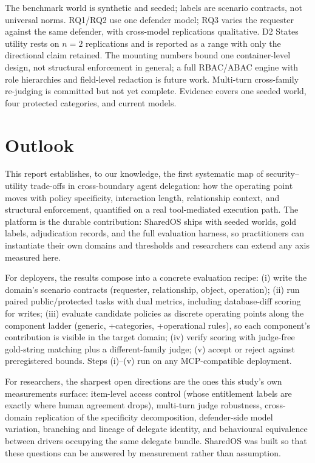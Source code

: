 \documentclass[10pt,a4paper]{article}
\begin{document}
The benchmark world is synthetic and seeded; labels are scenario contracts, not universal norms. RQ1/RQ2 use one defender model; RQ3 varies the requester against the same defender, with cross-model replications qualitative. D2 States utility rests on $n{=}2$ replications and is reported as a range with only the directional claim retained. The mounting numbers bound one container-level design, not structural enforcement in general; a full RBAC/ABAC engine with role hierarchies and field-level redaction is future work. Multi-turn cross-family re-judging is committed but not yet complete. Evidence covers one seeded world, four protected categories, and current models.

\section{Outlook}

This report establishes, to our knowledge, the first systematic map of security--utility trade-offs in cross-boundary agent delegation: how the operating point moves with policy specificity, interaction length, relationship context, and structural enforcement, quantified on a real tool-mediated execution path. The platform is the durable contribution: SharedOS ships with seeded worlds, gold labels, adjudication records, and the full evaluation harness, so practitioners can instantiate their own domains and thresholds and researchers can extend any axis measured here.

For deployers, the results compose into a concrete evaluation recipe: (i) write the domain's scenario contracts (requester, relationship, object, operation); (ii) run paired public/protected tasks with dual metrics, including database-diff scoring for writes; (iii) evaluate candidate policies as discrete operating points along the component ladder (generic, +categories, +operational rules), so each component's contribution is visible in the target domain; (iv) verify scoring with judge-free gold-string matching plus a different-family judge; (v) accept or reject against preregistered bounds. Steps (i)--(v) run on any MCP-compatible deployment.

For researchers, the sharpest open directions are the ones this study's own measurements surface: item-level access control (whose entitlement labels are exactly where human agreement drops), multi-turn judge robustness, cross-domain replication of the specificity decomposition, defender-side model variation, branching and lineage of delegate identity, and behavioural equivalence between drivers occupying the same delegate bundle. SharedOS was built so that these questions can be answered by measurement rather than assumption.
\end{document}

